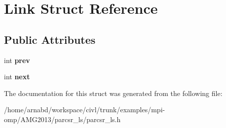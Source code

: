 \hypertarget{structLink}{}\section{Link Struct Reference}
\label{structLink}
\subsection*{Public Attributes}
\begin{DoxyCompactItemize}
\item 
\hypertarget{structLink_abf7002013aed48f481c6d6a78d628ebc}{}int {\bfseries prev}\label{structLink_abf7002013aed48f481c6d6a78d628ebc}

\item 
\hypertarget{structLink_afbdef2192207d6b65cff2957a34434d3}{}int {\bfseries next}\label{structLink_afbdef2192207d6b65cff2957a34434d3}

\end{DoxyCompactItemize}


The documentation for this struct was generated from the following file\+:\begin{DoxyCompactItemize}
\item 
/home/arnabd/workspace/civl/trunk/examples/mpi-\/omp/\+A\+M\+G2013/parcsr\+\_\+ls/parcsr\+\_\+ls.\+h\end{DoxyCompactItemize}
